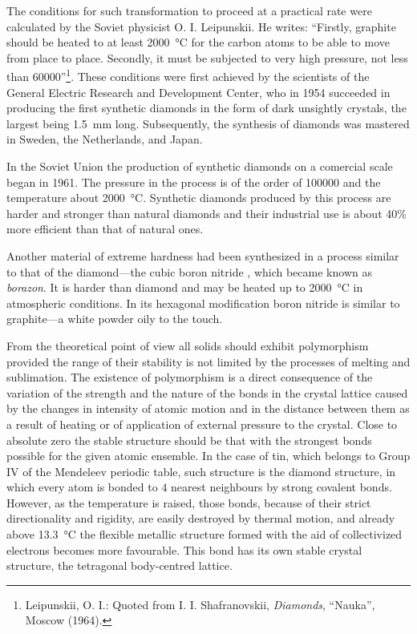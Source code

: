 The conditions for such transformation to proceed at a practical rate were calculated by the Soviet physicist O. I. Leipunskii. He writes: ``Firstly, graphite should be heated to at least \SI{2000}{\degreeCelsius} for the carbon atoms to be able to move from place to place. Secondly, it must be subjected to very high pressure, not less than \SI{60000}{\atm}''\footnote{Leipunskii, O. I.: Quoted from I. I. Shafranovskii, \textit{Diamonds}, ``Nauka'', Moscow (1964).}. These conditions were first achieved by the scientists of the General Electric Research and Development Center, who in 1954 succeeded in producing the first synthetic diamonds in the form of dark unsightly crystals, the largest being \SI{1.5}{\milli\metre} long. Subsequently, the synthesis of diamonds was mastered in Sweden, the Netherlands, and Japan.

In the Soviet Union the production of synthetic diamonds on a comercial scale began in 1961. The pressure in the process is of the order of \SI{100000}{\atm} and the temperature about \SI{2000}{\degreeCelsius}. Synthetic diamonds produced by this process are harder and stronger than natural diamonds and their industrial use is about 40\% more efficient than that of natural ones.

Another material of extreme hardness had been synthesized in a process similar to that of the diamond---the cubic boron nitride , which became known as \textit{borazon}. It is harder than diamond and may be heated up to \SI{2000}{\degreeCelsius} in atmospheric conditions. In its hexagonal modification boron nitride is similar to graphite---a white powder oily to the touch.

From the theoretical point of view all solids should exhibit polymorphism provided the range of their stability is not limited by the processes of melting and sublimation. The existence of polymorphism is a direct consequence of the variation of the strength and the nature of the bonds in the crystal lattice caused by the changes in intensity of atomic motion and in the distance between them as a result of heating or of application of external pressure to the crystal. Close to absolute zero the stable structure should be that with the strongest bonds possible for the given atomic ensemble. In the case of tin, which belongs to Group IV of the Mendeleev periodic table, such structure is the diamond structure, in which every atom is bonded to $4$ nearest neighbours by strong covalent bonds. However, as the temperature is raised, those bonds, because of their strict directionality and rigidity, are easily destroyed by thermal motion, and already above \SI{13.3}{\degreeCelsius} the flexible metallic structure formed with the aid of collectivized electrons becomes more favourable. This bond has its own stable crystal structure, the tetragonal body-centred lattice.

